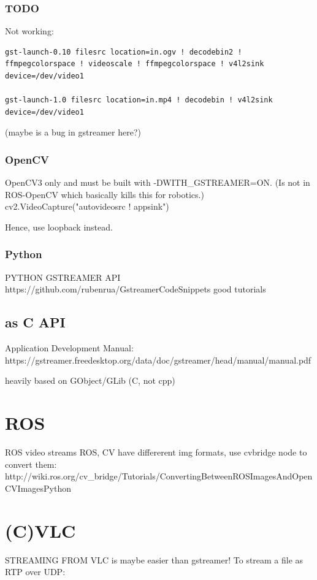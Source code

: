 \documentclass[oneside,english]{scrbook}
\begin{document}
\subsection{TODO}

Not working:
\begin{lstlisting}
gst-launch-0.10 filesrc location=in.ogv ! decodebin2 ! ffmpegcolorspace ! videoscale ! ffmpegcolorspace ! v4l2sink device=/dev/video1 

gst-launch-1.0 filesrc location=in.mp4 ! decodebin ! v4l2sink device=/dev/video1
\end{lstlisting}
(maybe is a bug in gstreamer here?)

\subsection{OpenCV}
OpenCV3 only and must be built with -DWITH_GSTREAMER=ON. (Is not in ROS-OpenCV which basically kills this for robotics.)
cv2.VideoCapture("autovideosrc ! appsink")

Hence, use loopback instead.


\subsection{Python}

PYTHON GSTREAMER API https://github.com/rubenrua/GstreamerCodeSnippets
good tutorials

\section{as C API}
Application Development Manual:  https://gstreamer.freedesktop.org/data/doc/gstreamer/head/manual/manual.pdf

heavily based on GObject/GLib (C, not cpp)



\chapter{ROS}

ROS video streams ROS, CV have differerent img formats, use cvbridge
node to convert them: http://wiki.ros.org/cv\_bridge/Tutorials/ConvertingBetweenROSImagesAndOpenCVImagesPython


\chapter{(C)VLC}

STREAMING FROM VLC is maybe easier than gstreamer! To stream a file
as RTP over UDP:
\end{document}
